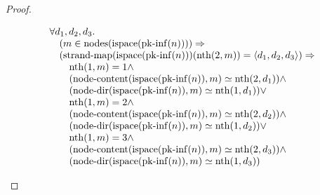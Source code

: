 \documentclass[11pt]{article}
\theoremstyle{plain}
\begin{document}
\begin{proof}
\begin{itemize}[leftmargin=2.8em, itemsep=4pt, parsep=1pt]
\begin{itemize}[leftmargin=2.8em, itemsep=4pt, parsep=1pt]
\begin{equation*}
\begin{array}{@{}l@{}}
\begin{array}{@{}l@{}} \forall d_{1}, d_{2}, d_{3}. \\ \quad (m \in \operatorname{nodes}(\operatorname{ispace}(\operatorname{pk\text{-}inf}(n)))) \Rightarrow  \\ \quad (\operatorname{strand\text{-}map}(\operatorname{ispace}(\operatorname{pk\text{-}inf}(n)))(\operatorname{nth}(2, m)) = \langle d_{1}, d_{2}, d_{3} \rangle) \Rightarrow  \\ \quad \quad \operatorname{nth}(1, m) = 1 \wedge \\ \quad \quad (\operatorname{node\text{-}content}(\operatorname{ispace}(\operatorname{pk\text{-}inf}(n)), m) \simeq \operatorname{nth}(2, d_{1})) \wedge \\ \quad \quad (\operatorname{node\text{-}dir}(\operatorname{ispace}(\operatorname{pk\text{-}inf}(n)), m) \simeq \operatorname{nth}(1, d_{1})) \vee \\ \quad \quad \operatorname{nth}(1, m) = 2 \wedge \\ \quad \quad (\operatorname{node\text{-}content}(\operatorname{ispace}(\operatorname{pk\text{-}inf}(n)), m) \simeq \operatorname{nth}(2, d_{2})) \wedge \\ \quad \quad (\operatorname{node\text{-}dir}(\operatorname{ispace}(\operatorname{pk\text{-}inf}(n)), m) \simeq \operatorname{nth}(1, d_{2})) \vee \\ \quad \quad \operatorname{nth}(1, m) = 3 \wedge \\ \quad \quad (\operatorname{node\text{-}content}(\operatorname{ispace}(\operatorname{pk\text{-}inf}(n)), m) \simeq \operatorname{nth}(2, d_{3})) \wedge \\ \quad \quad (\operatorname{node\text{-}dir}(\operatorname{ispace}(\operatorname{pk\text{-}inf}(n)), m) \simeq \operatorname{nth}(1, d_{3})) \end{array} \\

\end{array}
\end{equation*}
\end{itemize}
\end{itemize}
\end{proof}
\end{document}
